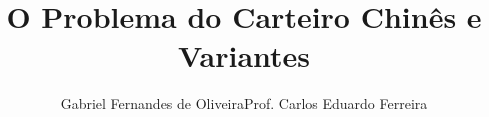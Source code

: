 \documentclass{beamer}
\title[Problema do Carteiro Chinês e Variações]{O Problema do Carteiro Chinês e Variantes}
\author[Gabriel F. Oliveira]{Gabriel Fernandes de Oliveira\newline Prof. Carlos Eduardo Ferreira}
\institute[IME - USP]{Instituto de Matemática e Estatística da USP}
\begin{document}

\begin{frame}
    \titlepage
\end{frame}
    

\end{document}
